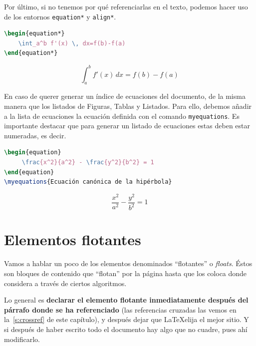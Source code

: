 \documentclass[%
    school=etsisi,%
    type=tfg,%
    degree=61CD,%
]{upm-report}
\begin{document}
Por último, si no tenemos por qué referenciarlas en el texto, podemos hacer uso de los entornos \texttt{equation*} y \texttt{align*}.

\begin{minipage}[c]{.5\textwidth}
\begin{lstlisting}[language=tex]
\begin{equation*}
    \int_a^b f'(x) \, dx=f(b)-f(a)
\end{equation*}
\end{lstlisting}
\end{minipage}%
\begin{minipage}[c]{.5\textwidth}
\begin{equation*}
    \int_a^b f'(x) \, dx=f(b)-f(a)
\end{equation*}
\end{minipage}

En caso de querer generar un índice de ecuaciones del documento, de la misma manera que los listados de Figuras, Tablas y Listados. Para ello, debemos añadir a la lista de ecuaciones la ecuación definida con el comando \texttt{myequations}. Es importante destacar que para generar un listado de ecuaciones estas deben estar numeradas, es decir.

\begin{minipage}[c]{.5\textwidth}
\begin{lstlisting}[language=tex]
\begin{equation}
     \frac{x^2}{a^2} - \frac{y^2}{b^2} = 1
\end{equation}
\myequations{Ecuación canónica de la hipérbola}
\end{lstlisting}
\end{minipage}%
\begin{minipage}[c]{.5\textwidth}
\begin{equation}
     \frac{x^2}{a^2} - \frac{y^2}{b^2} = 1
\end{equation}
\end{minipage} 

\section{Elementos flotantes}

Vamos a hablar un poco de los elementos denominados \enquote{flotantes} o \textit{floats}. Éstos son bloques de contenido que \enquote{flotan} por la página hasta que  los coloca donde considera a través de ciertos algoritmos.

Lo general es \textbf{declarar el elemento flotante inmediatamente después del párrafo donde se ha referenciado} (las referencias cruzadas las vemos en la~\autoref{s:crossref} de este capítulo), y después dejar que \LaTeX\space elija el mejor sitio. Y si después de haber escrito todo el documento hay algo que no cuadre, pues ahí modificarlo.
\end{document}
